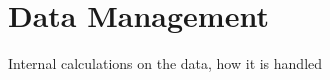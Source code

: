 \section{Data Management}
\label{chap:dataman}

Internal calculations on the data, how it is handled

